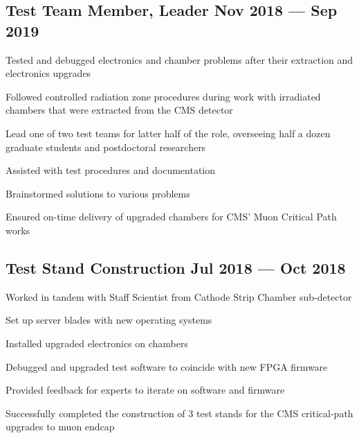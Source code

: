 \documentclass[letter,10pt]{article}
\begin{document}
\subsection{{Test Team Member, Leader \hfill Nov 2018 --- Sep 2019}}
\begin{zitemize}
\item Tested and debugged electronics and chamber problems after their extraction and electronics upgrades
\item Followed controlled radiation zone procedures during work with irradiated chambers that were extracted from the CMS detector
\item Lead one of two test teams for latter half of the role, overseeing half a dozen graduate students and postdoctoral researchers
\item Assisted with test procedures and documentation
\item Brainstormed solutions to various problems
\item Ensured on-time delivery of upgraded chambers for CMS' Muon Critical Path works
\end{zitemize}


\subsection{{Test Stand Construction \hfill Jul 2018 --- Oct 2018}}
\begin{zitemize}
\item Worked in tandem with Staff Scientist from Cathode Strip Chamber sub-detector
\item Set up server blades with new operating systems
\item Installed upgraded electronics on chambers
\item Debugged and upgraded test software to coincide with new FPGA
firmware
\item Provided feedback for experts to iterate on software and firmware
\item Successfully completed the construction of 3 test stands for the CMS critical-path upgrades to muon endcap
\end{zitemize}
\end{document}
